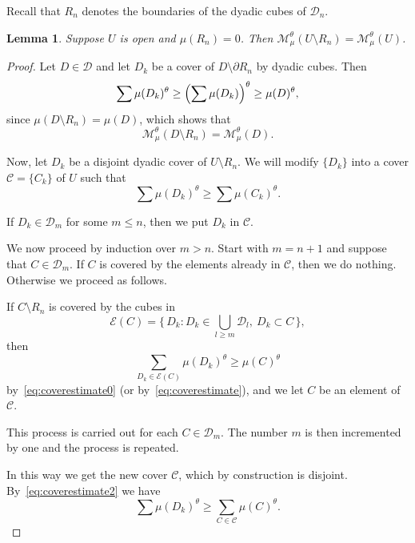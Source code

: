 \documentclass[11pt]{article}
\newtheorem{lemm}[theo]{Lemma}
\theoremstyle{definition}
\numberwithin{equation}{section}
\numberwithin{figure}{section}
\numberwithin{table}{section}
\begin{document}
Recall that $R_n$ denotes the boundaries of the dyadic cubes of $\mathscr{D}_n$.

\begin{lemm}\label{lem:opensets}
Suppose $U$ is open and $\mu (R_n) = 0$. Then $\mathscr{M}_\mu^\theta (U \setminus R_n) = \mathscr{M}_\mu^\theta (U)$.
\end{lemm}

\begin{proof}
Let $D \in \mathscr{D}$ and let $D_k$ be a cover of $D \setminus
\partial R_n$ by dyadic cubes. Then
\begin{equation}\label{eq:coverestimate0}
\sum \mu (D_k)^\theta \geq \Bigl(\sum \mu(D_k) \Bigr)^\theta \geq
\mu (D)^\theta,
\end{equation}
since $\mu (D \setminus R_n) = \mu (D)$, which shows that
\begin{equation}\label{eq:coverestimate}
\mathscr{M}_\mu^\theta (D \setminus R_n) = \mathscr{M}_\mu^\theta (D).
\end{equation}

Now, let $D_k$ be a disjoint dyadic cover of $U \setminus R_n$. We will modify $\{D_k\}$ into a cover $\mathscr{C} = \{C_k\}$ of $U$ such that
\[
\sum \mu (D_k)^\theta \geq \sum \mu (C_k)^\theta.
\]

If $D_k \in \mathscr{D}_m$ for some $m \leq n$, then we put $D_k$ in $\mathscr{C}$.

We now proceed by induction over $m > n$. Start with $m = n +1$ and suppose that $C \in \mathscr{D}_m$. If $C$ is covered by the elements already in $\mathscr{C}$, then we do nothing. Otherwise we proceed as follows.

If $C \setminus R_n$ is covered by the cubes in
\[
\mathscr{E} (C) = \biggl\{\, D_k : D_k \in \bigcup_{l \geq m}
\mathscr{D}_l,\ D_k \subset C\, \biggr\},
\]
then
\begin{equation}\label{eq:coverestimate2}
\sum_{D_k \in \mathscr{E} (C)} \mu (D_k)^\theta \geq \mu (C)^\theta
\end{equation}
by~\eqref{eq:coverestimate0} (or by~\eqref{eq:coverestimate}), and we let $C$ be an element of $\mathscr{C}$.

This process is carried out for each $C \in \mathscr{D}_m$. The number $m$ is then incremented by one and the process is repeated.

In this way we get the new cover $\mathscr{C}$, which by construction is disjoint. By~\eqref{eq:coverestimate2} we have
\begin{equation}\label{eq:coverestimate3}
\sum \mu (D_k)^\theta \geq \sum_{C \in \mathscr{C}} \mu (C)^\theta.
\end{equation}


\end{proof}
\end{document}
